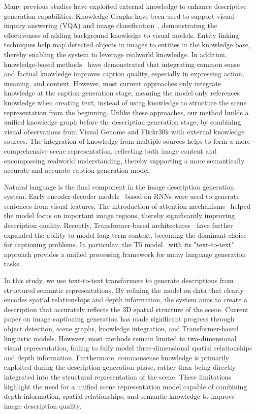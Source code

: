 \documentclass[runningheads,14pt]{llncs}
\begin{document}
Many previous studies have exploited external knowledge to enhance descriptive generation capabilities. Knowledge Graphs have been used to support visual inquiry answering (VQA) and image classification~\cite{marino2017ok}, demonstrating the effectiveness of adding background knowledge to visual models. Entity linking techniques help map detected objects in images to entities in the knowledge base, thereby enabling the system to leverage realworld knowledge. In addition, knowledge-based methods~\cite{zhao2021knowledge,wu2017image} have demonstrated that integrating common sense and factual knowledge improves caption quality, especially in expressing action, meaning, and context. However, most current approaches only integrate knowledge at the caption generation stage, meaning the model only references knowledge when creating text, instead of using knowledge to structure the scene representation from the beginning. Unlike these approaches, our method builds a unified knowledge graph before the description generation stage, by combining visual observations from Visual Genome and Flickr30k with external knowledge sources. The integration of knowledge from multiple sources helps to form a more comprehensive scene representation, reflecting both image content and encompassing realworld understanding, thereby supporting a more semantically accurate and accurate caption generation model.

Natural language is the final component in the image description generation system. Early encoder-decoder models~\cite{vinyals2015show,karpathy2015deep} based on RNNs were used to generate sentences from visual features. The introduction of attention mechanisms~\cite{xu2015show,anderson2018bottom} helped the model focus on important image regions, thereby significantly improving description quality. Recently, Transformer-based architectures~\cite{li2024exploring,cornia2020meshed} have further expanded the ability to model long-term context, becoming the dominant choice for captioning problems. In particular, the T5 model~\cite{raffel2020exploring} with its "text-to-text" approach provides a unified processing framework for many language generation tasks.

In this study, we use text-to-text transformers to generate descriptions from structured semantic representations. By refining the model on data that clearly encodes spatial relationships and depth information, the system aims to create a description that accurately reflects the 3D spatial structure of the scene. Current paper on image captioning generation has made significant progress through object detection, scene graphs, knowledge integration, and Transformer-based linguistic models. However, most methods remain limited to two-dimensional visual representation, failing to fully model three-dimensional spatial relationships and depth information. Furthermore, commonsense knowledge is primarily exploited during the description generation phase, rather than being directly integrated into the structural representation of the scene. These limitations highlight the need for a unified scene representation model capable of combining depth information, spatial relationships, and semantic knowledge to improve image description quality.
\end{document}
